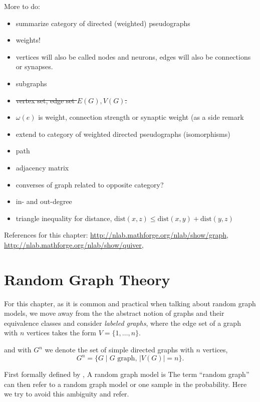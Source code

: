 More to do:

\begin{itemize}
\item summarize category of directed (weighted) pseudographs
\item weights!
\item vertices will also be called nodes and neurons, edges will also
  be connections or synapses.
\item subgraphs
\item \sout{vertex set, edge set $E(G), V(G)$.}
\item $\omega(e)$ is weight, connection strength or synaptic weight
  (as a side remark
\item extend to category of weighted directed pseudographs
  (isomorphisms)
\item path
\item adjacency matrix
\item converses of graph related to opposite category?
\item in- and out-degree
\item triangle inequality for distance, $\mathrm{dist}(x,z) \leq
  \mathrm{dist}(x,y) + \mathrm{dist}(y,z)$
\end{itemize}



References for this chapter:
\url{http://nlab.mathforge.org/nlab/show/graph},
\url{http://nlab.mathforge.org/nlab/show/quiver}, \parencite{Bang-Jensen_Digraphs} 




\section{Random Graph Theory}\label{sec:random_graph_theory}

For this chapter, as it is common and practical when talking about
random graph models, we move away from the the abstract notion of graphs and
their equivalence classes and consider \textit{labeled graphs}, where
the edge set of a graph with $n$ vertices takes the form $V =
\{1,\ldots,n\}$.

and with $G^n$ we denote the set of simple directed graphs with $n$ vertices, 
\[
G^n = \{G \mid G\,\mathrm{\,graph},\, |V(G)| = n\}.
\]

First formally defined by , \textcite{Erdos1959}
A random graph model is 
The term \enquote{random graph} can then refer to a random graph model
or one sample in the probability. Here we try to avoid this ambiguity
and refer. 

